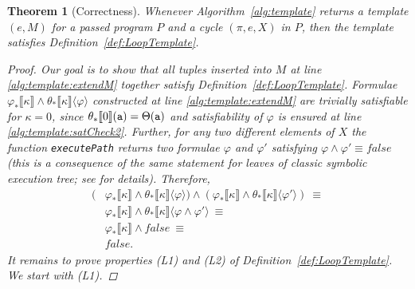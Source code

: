 \documentclass{sig-alternate}%
\newtheorem{thm}{Theorem}%
\newcommand{\false}{\ensuremath{\mathit{false}}}
\newcommand{\var}[1]{{\tt #1}}
\newcommand{\prm}[1]{\ensuremath{\llbracket #1 \rrbracket}}
\begin{document}
\begin{thm}[Correctness]
Whenever Algorithm~\ref{alg:template} returns a template $(e,M)$ for a
passed program $P$ and a cycle $(\pi,e,X)$ in $P$, then the template
satisfies Definition~\ref{def:LoopTemplate}.
\begin{proof}
Our goal is to show that all tuples inserted into $M$ at line
\ref{alg:template:extendM} together satisfy
Definition~\ref{def:LoopTemplate}. Formulae $\varphi_*\prm{\kappa}
\wedge \theta_*\prm{\kappa} \langle\varphi\rangle$ constructed at line
\ref{alg:template:extendM} are trivially satisfiable for $\kappa = 0$,
since $\theta_*\prm{0}(\var{a}) = \Theta(\var{a})$ and satisfiability of
$\varphi$ is ensured at line \ref{alg:template:satCheck2}. Further,
for any two different  elements of $X$ the function
\texttt{executePath} returns two formulae $\varphi$ and $\varphi'$
satisfying $\varphi \wedge \varphi' \equiv \false$ (this is a
consequence of the same statement for leaves of classic symbolic
execution tree; see \cite{Kin76} for details). Therefore,
\begin{align*}
(&\varphi_*\prm{\kappa} \wedge \theta_*\prm{\kappa}
\langle\varphi\rangle) \wedge (\varphi_*\prm{\kappa} \wedge
\theta_*\prm{\kappa} \langle\varphi'\rangle)~\equiv\\
&\varphi_*\prm{\kappa} \wedge \theta_*\prm{\kappa}\langle\varphi
\wedge \varphi'\rangle~\equiv\\
&\varphi_*\prm{\kappa} \wedge \false~\equiv\\
&\false.
\end{align*}
It remains to prove properties (L1) and (L2) of
Definition~\ref{def:LoopTemplate}. We start with (L1).


\end{proof}
\end{thm}
\end{document}
